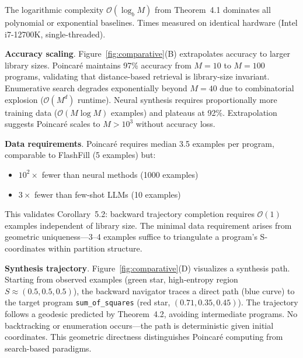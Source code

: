 \documentclass[twocolumn,10pt]{article}
\begin{document}
The logarithmic complexity $\mathcal{O}(\log_b M)$ from Theorem~4.1 dominates all polynomial or exponential baselines. Times measured on identical hardware (Intel i7-12700K, single-threaded).

\textbf{Accuracy scaling}. Figure~\ref{fig:comparative}(B) extrapolates accuracy to larger library sizes. Poincaré maintains 97\% accuracy from $M=10$ to $M=100$ programs, validating that distance-based retrieval is library-size invariant. Enumerative search degrades exponentially beyond $M=40$ due to combinatorial explosion ($\mathcal{O}(M^d)$ runtime). Neural synthesis requires proportionally more training data ($\mathcal{O}(M \log M)$ examples) and plateaus at 92\%. Extrapolation suggests Poincaré scales to $M > 10^3$ without accuracy loss.

\textbf{Data requirements}. Poincaré requires median 3.5 examples per program, comparable to FlashFill (5 examples) but:
\begin{itemize}
\item $10^2\times$ fewer than neural methods (1000 examples)
\item $3\times$ fewer than few-shot LLMs (10 examples)
\end{itemize}

This validates Corollary~5.2: backward trajectory completion requires $\mathcal{O}(1)$ examples independent of library size. The minimal data requirement arises from geometric uniqueness—3--4 examples suffice to triangulate a program's S-coordinates within partition structure.

\textbf{Synthesis trajectory}. Figure~\ref{fig:comparative}(D) visualizes a synthesis path. Starting from observed examples (green star, high-entropy region $S \approx (0.5, 0.5, 0.5)$), the backward navigator traces a direct path (blue curve) to the target program \texttt{sum\_of\_squares} (red star, $(0.71, 0.35, 0.45)$). The trajectory follows a geodesic predicted by Theorem~4.2, avoiding intermediate programs. No backtracking or enumeration occurs—the path is deterministic given initial coordinates. This geometric directness distinguishes Poincaré computing from search-based paradigms.
\end{document}

